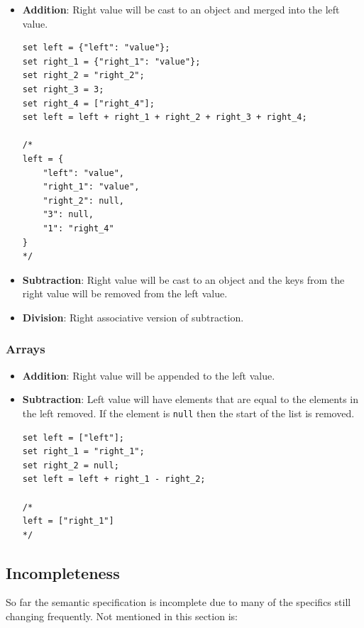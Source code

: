 \documentclass[]{interim}
\theoremstyle{definition}
\begin{document}
\begin{itemize}
    \item \textbf{Addition}: Right value will be cast to an object and merged into the left value.
    \begin{verbatim}
set left = {"left": "value"};
set right_1 = {"right_1": "value"};
set right_2 = "right_2";
set right_3 = 3;
set right_4 = ["right_4"];
set left = left + right_1 + right_2 + right_3 + right_4;

/*
left = {
    "left": "value",
    "right_1": "value",
    "right_2": null,
    "3": null,
    "1": "right_4"
}
*/
    \end{verbatim}
    \item \textbf{Subtraction}: Right value will be cast to an object and the keys from the right value will be removed from the left value.
    \item \textbf{Division}: Right associative version of subtraction.
\end{itemize}

\subsubsection{Arrays}

\begin{itemize}
    \item \textbf{Addition}: Right value will be appended to the left value.
    \item \textbf{Subtraction}: Left value will have elements that are equal to the elements in the left removed. If the element is \verb|null| then the start of the list is removed.
    \begin{verbatim}
set left = ["left"];
set right_1 = "right_1";
set right_2 = null;
set left = left + right_1 - right_2;

/*
left = ["right_1"]
*/
    \end{verbatim}
\end{itemize}

\subsection{Incompleteness}

So far the semantic specification is incomplete due to many of the specifics still changing frequently. Not mentioned in this section is:
\end{document}

